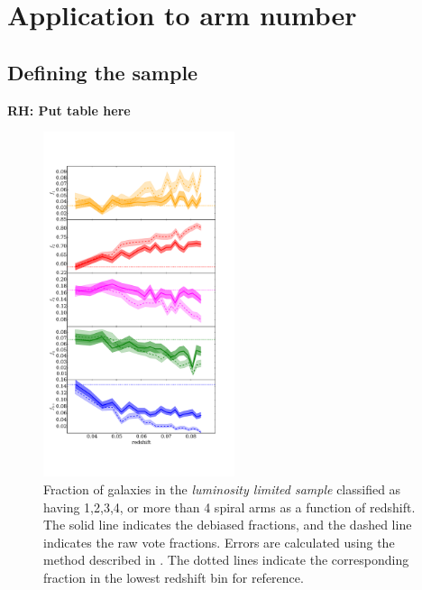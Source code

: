 \documentclass[useAMS,usenatbib]{mn2e}
\newcommand{\rh}[1]{{\bf \textcolor{RoyalPurple}{RH: #1}}}
\begin{document}
\section{Application to arm number}
\label{sec:results}


\subsection{Defining the sample}

\rh{Put table here}

\begin{figure}
		\centering
		
        \includegraphics[width=0.5\textwidth]{Data_imgs/redshift_plot.pdf}
		
        \caption{Fraction of galaxies in the \textit{luminosity limited sample} classified as having 1,2,3,4, or more than 4 spiral arms as a function of redshift. The solid line indicates the debiased fractions, and the dashed line indicates the raw vote fractions. Errors are calculated using the method described in \citet{Cameron_11}. The dotted lines indicate the corresponding fraction in the lowest redshift bin for reference.}
		
        \label{fig:arm_number_trend}
        
\end{figure}
\end{document}
